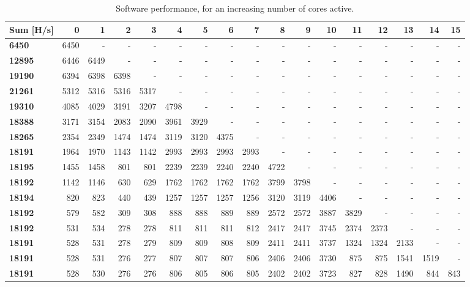 \begin{appendix}
\begin{sidewaystable}
\centering
\begin{tabular}{| l || r r r r | r r r r | r r r | r r r r r |}
  \hline 
  \textbf{Sum} [H/s] & \textbf{0} & \textbf{1} & \textbf{2} & \textbf{3} & \textbf{4} & \textbf{5} & \textbf{6} & \textbf{7} & \textbf{8} & \textbf{9} & \textbf{10} & \textbf{11} & \textbf{12} & \textbf{13} & \textbf{14} & \textbf{15}   \\
  \hline                       
  \textbf{6450} & 6450 & - & - & - & - & - & - & - & - & - & - & - & - & - & - & - \\
  \textbf{12895} & 6446 &6449 & - & - & - & - & - & - & - & - & - & - & - & - & - & - \\
  \textbf{19190} & 6394 & 6398 & 6398 & - & - & - & - & - & - & - & - & - & - & - & - & - \\
  \textbf{21261} & 5312 & 5316 & 5316 & 5317 & - & - & - & - & - & - & - & - & - & - & - & - \\
  \textbf{19310} & 4085 & 4029 & 3191 & 3207 & 4798 & - & - & - & - & - & - & - & - & - & - & - \\
  \textbf{18388} & 3171 & 3154 & 2083 & 2090 & 3961 & 3929 & - & - & - & - & - & - & - & - & - & - \\
  \textbf{18265} & 2354 & 2349 & 1474 & 1474 & 3119 & 3120 & 4375 & - & - & - & - & - & - & - & - & - \\
  \textbf{18191} & 1964 & 1970 & 1143 & 1142 & 2993 & 2993 & 2993 & 2993 & - & - & - & - & - & - & - & -\\
  \textbf{18195} & 1455 & 1458 & 801 & 801 & 2239 & 2239 & 2240 & 2240 & 4722 & - & - & - & - & - & - & -\\
  \textbf{18192} & 1142 & 1146 & 630 & 629 & 1762 & 1762 & 1762 & 1762 & 3799 & 3798 & - & - & - & - & - & -\\
  \textbf{18194} & 820 & 823 & 440 & 439 & 1257 & 1257 & 1257 & 1256 & 3120 & 3119 & 4406 & - & - & - & - & -\\
  \textbf{18192} & 579 & 582 & 309 & 308 & 888 & 888 & 889 & 889 & 2572 & 2572 & 3887 & 3829 & - & - & - & -\\
  \textbf{18192} & 531 & 534 & 278 & 278 & 811 & 811 & 811 & 812 & 2417 & 2417 & 3745 & 2374 & 2373 & - & - & -\\
  \textbf{18191} & 528 & 531 & 278 & 279 & 809 & 809 & 808 & 809 & 2411 & 2411 & 3737 & 1324 & 1324 & 2133 & - & -\\
  \textbf{18191} & 528 & 531 & 276 & 277 & 807 & 807 & 807 & 806 & 2406 & 2406 & 3730 & 875 & 875 & 1541 & 1519	 & -\\
  \textbf{18191} & 528 & 530 & 276 & 276 & 806 & 805 & 806 & 805 & 2402 & 2402 & 3723 & 827 & 828 & 1490 & 844 & 843\\
  \hline  
\end{tabular}
\caption{Software performance, for an increasing number of cores active.}
\label{tab:Full-Perf-SW1}
\end{sidewaystable}


\end{appendix}
